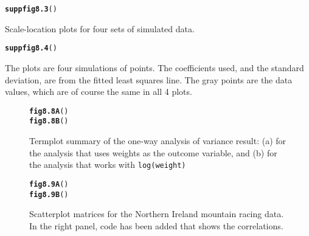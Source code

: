 \documentclass[12pt, a4paper,  BCOR=8.25mm, DIV=15]{scrartcl}\usepackage[]{graphicx}\usepackage[]{color}
\makeatletter
\newcommand{\hlstd}[1]{\textcolor[rgb]{0.345,0.345,0.345}{#1}}%
\newcommand{\hlkwd}[1]{\textcolor[rgb]{0.737,0.353,0.396}{\textbf{#1}}}%
\newenvironment{kframe}{%
 \def\at@end@of@kframe{}%
 \ifinner\ifhmode%
  \def\at@end@of@kframe{\end{minipage}}%
  \begin{minipage}{\columnwidth}%
 \fi\fi%
 \def\FrameCommand##1{\hskip\@totalleftmargin \hskip-\fboxsep
 \colorbox{shadecolor}{##1}\hskip-\fboxsep
     \hskip-\linewidth \hskip-\@totalleftmargin \hskip\columnwidth}%
 \MakeFramed {\advance\hsize-\width
   \@totalleftmargin\z@ \linewidth\hsize
   \@setminipage}}%
 {\par\unskip\endMakeFramed%
 \at@end@of@kframe}
\newenvironment{knitrout}{}{} %
\newcommand{\txtt}[1]{{\texttt{#1}}}
\makeatother
\begin{document}
\begin{suppfigure}[H]
\begin{knitrout}
\color{fgcolor}\begin{kframe}
\begin{alltt}
\hlkwd{suppfig8.3}\hlstd{()}
\end{alltt}
\end{kframe}
\end{knitrout}
\caption{Scale-location plots for four sets of simulated
  data.}\label{fig:mftimesimdiag3}
\end{suppfigure}

\begin{suppfigure}[H]
\begin{knitrout}
\color{fgcolor}\begin{kframe}
\begin{alltt}
\hlkwd{suppfig8.4}\hlstd{()}
\end{alltt}
\end{kframe}
\end{knitrout}
\vspace*{-9pt}

\caption{The plots are four simulations of points.  The coefficients
  used, and the standard deviation, are from the fitted least squares
  line. The gray points are the data values, which are of course the
same in all 4 plots.}\label{fig:4sim-nimff}
\end{suppfigure}

\begin{figure}[H]
\begin{knitrout}
\color{fgcolor}\begin{kframe}
\begin{alltt}
\hlkwd{fig8.8A}\hlstd{()}
\hlkwd{fig8.8B}\hlstd{()}
\end{alltt}
\end{kframe}
\end{knitrout}
 \caption{Termplot summary of the one-way analysis of variance result:
(a) for the analysis that uses weights as the outcome variable, and
(b) for the analysis that works with \txtt{log(weight)}}
\label{fig:tomatoterm}
\end{figure}


\begin{figure}[H]
\begin{knitrout}
\color{fgcolor}\begin{kframe}
\begin{alltt}
\hlkwd{fig8.9A}\hlstd{()}
\hlkwd{fig8.9B}\hlstd{()}
\end{alltt}
\end{kframe}
\end{knitrout}
\caption{Scatterplot matrices for the Northern Ireland mountain racing
  data. In the right panel, code has been added that shows the
  correlations.
\label{fig:nimra-reg}}
\end{figure}
\end{document}
